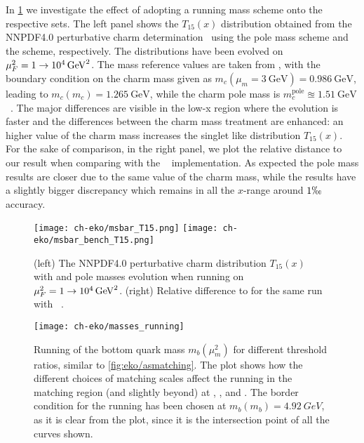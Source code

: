 In \cref{fig:eko/MSbarbench} we investigate the effect of adopting a running mass
scheme onto the respective \pdf{} sets. The left panel shows the $T_{15}(x)$
distribution obtained from the NNPDF4.0 perturbative charm
determination~\cite{NNPDF:2021njg} using the pole mass scheme and the \msbar{}
scheme, respectively.
The distributions have been evolved on $\muF^2=\SI[parse-numbers=false]{1\to
10^4}{\GeV^2}$.
The mass reference values are taken from
\cite{LHCHiggsCrossSectionWorkingGroup:2016ypw}, with the \msbar{}
boundary condition on the charm mass given as $m_c(\mu_m=\SI{3}{\GeV}) =
\SI{0.986}{\GeV}$, leading to $m_c(m_c) = \SI{1.265}{\GeV}$, while the charm
pole mass is $m^\text{pole}_{c}\approxeq\SI{1.51}{\GeV}$~\cite{NNPDF:2021njg}.
The major differences are visible in the low-x region where the \dglap{}
evolution is faster and the differences between the charm mass treatment are
enhanced: an higher value of the charm mass increases the singlet like
distribution $T_{15}(x)$.
For the sake of comparison, in the right panel, we plot the relative distance
to our result when comparing with the \apfel{}~\cite{Bertone:2013vaa}
implementation.
As expected the pole mass results are closer due to the same value of the charm
mass, while the \msbar{} results have a slightly bigger discrepancy which
remains in all the $x$-range around $1\permil$ accuracy.

\begin{figure}
    \centering
    \texttt{[image: ch-eko/msbar\_T15.png]}
    \texttt{[image: ch-eko/msbar\_bench\_T15.png]}
    \caption{(left) The NNPDF4.0 perturbative charm distribution
        $T_{15}(x)$~\cite{NNPDF:2021njg} with \msbar{} and pole masses \nnlo{}
        evolution when running on $\muF^2=\SI[parse-numbers=false]{1\to
        10^4}{\GeV^2}$.  (right) Relative difference to \eko{} for the same run
        with \apfel{}~\cite{Bertone:2013vaa}.}
     \label{fig:eko/MSbarbench}
\end{figure}

\begin{figure}
    \centering
    \texttt{[image: ch-eko/masses\_running]}
    \caption{Running of the bottom quark mass $m_b(\mu_m^2)$ for different threshold
        ratios, similar to \cref{fig:eko/asmatching}.
        The plot shows how the different choices of matching scales affect the
        running in the matching region (and slightly beyond) at \lo{}, \nlo{},
        and \nnlo{}.
        The border condition for the running has been chosen at $m_b(m_b) =
        \SI{4.92}{GeV}$, as it is clear from the plot, since it is the
        intersection point of all the curves shown.}
    \label{fig:eko/runningmasses}
\end{figure}


